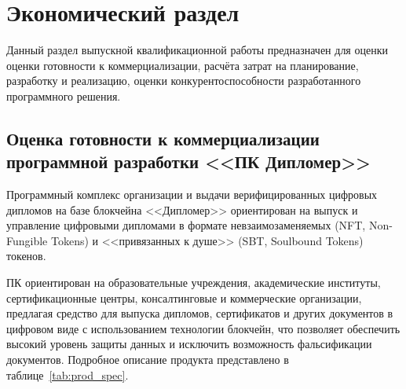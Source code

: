 \section{Экономический раздел}
\label{sec:economy}

Данный раздел выпускной квалификационной работы предназначен для оценки оценки готовности к коммерциализации, расчёта затрат на планирование, разработку и реализацию, оценки конкурентоспособности разработанного программного решения.

\subsection{Оценка готовности к коммерциализации программной разработки <<ПК Дипломер>>}

Программный комплекс организации и выдачи верифицированных цифровых дипломов на базе блокчейна <<Дипломер>> ориентирован на выпуск и управление цифровыми дипломами в формате невзаимозаменяемых (NFT, Non-Fungible Tokens) и <<привязанных к душе>> (SBT, Soulbound Tokens) токенов.

ПК ориентирован на образовательные учреждения, академические институты, сертификационные центры, консалтинговые и коммерческие организации, предлагая средство для выпуска дипломов, сертификатов и других документов в цифровом виде с использованием технологии блокчейн, что позволяет обеспечить высокий уровень защиты данных и исключить возможность фальсификации документов. Подробное описание продукта представлено в таблице~\ref{tab:prod_spec}.

